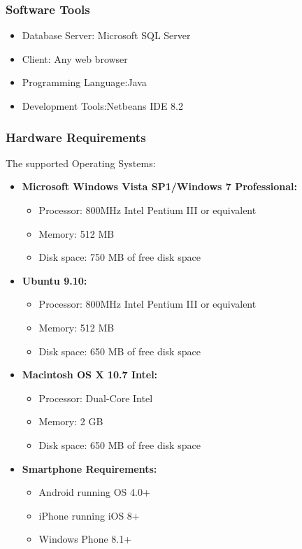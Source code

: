 \documentclass[11 pt]{article}
\begin{document}
    \subsubsection{Software Tools}
    \begin{itemize}
    \item
     Database Server: Microsoft SQL Server
    \item
     Client: Any web browser
     \item
     Programming Language:Java
     \item
     Development Tools:Netbeans IDE 8.2
    \end{itemize}
    
    \subsubsection{Hardware Requirements}
The supported Operating Systems:
\begin{itemize}

\item
        \textbf{Microsoft Windows Vista SP1/Windows 7 Professional:}
        \begin{itemize}
        
            \item
            Processor: 800MHz Intel Pentium III or equivalent
            \item
            Memory: 512 MB
            \item
            Disk space: 750 MB of free disk space
            \end{itemize}
\item
        \textbf{Ubuntu 9.10:}
        \begin{itemize}
        \item
            Processor: 800MHz Intel Pentium III or equivalent
            \item
            Memory: 512 MB
            \item
            Disk space: 650 MB of free disk space
            \end{itemize}
        \item
        \textbf{Macintosh OS X 10.7 Intel:}
        \begin{itemize}
        
            \item
            Processor: Dual-Core Intel
            \item
            Memory: 2 GB
            \item
            Disk space: 650 MB of free disk space
            \end{itemize}
            \item
            \textbf{Smartphone Requirements:}
\begin{itemize}

\item
    Android running OS 4.0+
    \item
    iPhone running iOS 8+
    \item
    Windows Phone 8.1+
\end{itemize}
\end{itemize}
\end{document}
